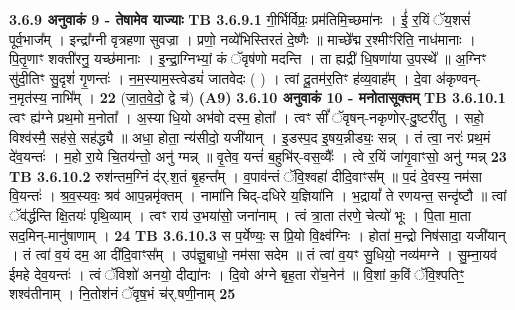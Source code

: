 \documentclass[17pt]{extarticle}
\begin{document}
{{{{{{{{{{{{{{{{{{{                \textbf{ 3.6.9     अनुवाकं   9 - तेषामेव याज्याः} \newline
                                \textbf{ TB 3.6.9.1} \newline
                  गी॒र्भिर्विप्रः॒ प्रम॑तिमि॒च्छमा॑नः । ई॒॑ र॒यिं ॅय॒शसं॑ पूर्व॒भाज᳚म् । इन्द्रा᳚ग्नी वृत्रहणा सुवज्रा । प्रणो॒ नव्ये॑भिस्तिरतं दे॒ष्णैः ॥ माच्छे᳚द्म र॒श्मीꣳरिति॒ नाध॑मानाः । पि॒तृ॒णाꣳ शक्ती॑रनु॒ यच्छ॑मानाः । इ॒न्द्रा॒ग्निभ्यां॒ कं ॅवृष॑णो मदन्ति । ता ह्यद्री॑ धि॒षणा॑या उ॒पस्थे᳚ ॥ अ॒ग्निꣳ सु॑दी॒तिꣳ सु॒दृशं॑ गृ॒णन्तः॑ । न॒म॒स्याम॒स्त्वेड्यं॑ जातवेदः ( ) । त्वां दू॒तम॑र॒तिꣳ ह॑व्य॒वाह᳚म् । दे॒वा अ॑कृण्वन्-न॒मृत॑स्य॒ नाभि᳚म् । \textbf{ 22} \newline
                  \newline
                                    (जा॒त॒वे॒दो॒ द्वे च॑) \textbf{(A9)} \newline \newline
                \textbf{ 3.6.10    अनुवाकं   10 - मनोतासूक्तम्} \newline
                                \textbf{ TB 3.6.10.1} \newline
                  त्वꣳ ह्य॑ग्ने प्रथ॒मो म॒नोता᳚ । अ॒स्या धि॒यो अभ॑वो दस्म॒ होता᳚ । त्वꣳ सीं᳚ ॅवृषन्-नकृणोर्-दु॒ष्टरी॑तु । सहो॒ विश्व॑स्मै॒ सह॑से॒ सह॑द्ध्यै ॥ अधा॒ होता॒ न्य॑सीदो॒ यजी॑यान् । इ॒डस्प॒द इ॒षय॒न्नीड्यः॒ सन्न् । तं त्वा॒ नरः॑ प्रथ॒मं दे॑व॒यन्तः॑ । म॒हो रा॒ये चि॒तय॑न्तो॒ अनु॑ ग्मन्न् ॥ वृ॒तेव॒ यन्तं॑ ब॒हुभि॑र्-वस॒व्यैः᳚ । त्वे र॒यिं जा॑गृ॒वाꣳसो॒ अनु॑ ग्मन्न् \textbf{ 23} \newline
                  \newline
                                \textbf{ TB 3.6.10.2} \newline
                  रुश॑न्तम॒ग्निं द॑र्.श॒तं बृ॒हन्त᳚म् । व॒पाव॑न्तं ॅवि॒श्वहा॑ दीदि॒वाꣳस᳚म् ॥ प॒दं दे॒वस्य॒ नम॑सा वि॒यन्तः॑ । श्र॒व॒स्यवः॒ श्रव॑ आप॒न्नमृ॑क्तम् । नामा॑नि चिद्-दधिरे य॒ज्ञिया॑नि । भ॒द्रायां᳚ ते रणयन्त॒ सन्दृ॑ष्टौ ॥ त्वां ॅव॑र्द्धन्ति क्षि॒तयः॑ पृथि॒व्याम् । त्वꣳ राय॑ उ॒भया॑सो॒ जना॑नाम् । त्वं त्रा॒ता त॑रणे॒ चेत्यो॑ भूः । पि॒ता मा॒ता सद॒मिन्-मानु॑षाणाम् । \textbf{ 24} \newline
                  \newline
                                \textbf{ TB 3.6.10.3} \newline
                  स प॒र्येण्यः॒ स प्रि॒यो वि॒क्ष्व॑ग्निः । होता॑ म॒न्द्रो निष॑सादा॒ यजी॑यान् । तं त्वा॑ व॒यं दम॒ आ दी॑दि॒वाꣳस᳚म् । उप॑ज्ञु॒बाधो॒ नम॑सा सदेम ॥ तं त्वा॑ व॒यꣳ सु॒धियो॒ नव्य॑मग्ने । सु॒म्ना॒यव॑ ईमहे देव॒यन्तः॑ । त्वं ॅविशो॑ अनयो॒ दीद्या॑नः । दि॒वो अ॑ग्ने बृह॒ता रो॑च॒नेन॑ ॥ वि॒शां क॒विं ॅवि॒श्पतिꣳ॒॒ शश्व॑तीनाम् । नि॒तोश॑नं ॅवृष॒भं च॑र्.षणी॒नाम् \textbf{ 25} \newline
}}}}}}}}}}}}}}}}}}}
\end{document}
